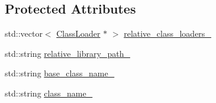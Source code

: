 \subsection*{Protected Attributes}
\begin{DoxyCompactItemize}
\item 
std\-::vector$<$ \hyperlink{classapollo_1_1cyber_1_1class__loader_1_1ClassLoader}{Class\-Loader} $\ast$ $>$ \hyperlink{classapollo_1_1cyber_1_1class__loader_1_1utility_1_1AbstractClassFactoryBase_a799a4b8522bd2ea3a18a93f609fb11e3}{relative\-\_\-class\-\_\-loaders\-\_\-}
\item 
std\-::string \hyperlink{classapollo_1_1cyber_1_1class__loader_1_1utility_1_1AbstractClassFactoryBase_a1c2cc5e713ea276459d1e9d6a64f706c}{relative\-\_\-library\-\_\-path\-\_\-}
\item 
std\-::string \hyperlink{classapollo_1_1cyber_1_1class__loader_1_1utility_1_1AbstractClassFactoryBase_a88a382cea8c075811b0415d3d30d1c8f}{base\-\_\-class\-\_\-name\-\_\-}
\item 
std\-::string \hyperlink{classapollo_1_1cyber_1_1class__loader_1_1utility_1_1AbstractClassFactoryBase_adcbcb8ef76b8b1275daa473685335864}{class\-\_\-name\-\_\-}
\end{DoxyCompactItemize}


